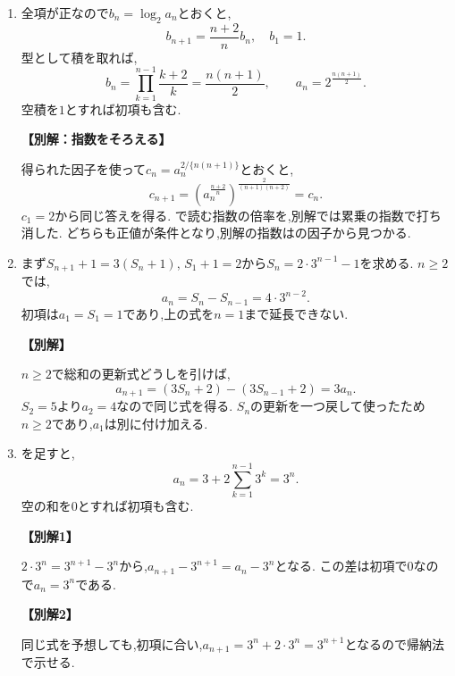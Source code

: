 \begin{enumerate}[label=\textbf{問\arabic*.},leftmargin=3.8em,format=\bookitemlink{practice-basic}{solution}{problem}]
          \item 全項が正なので$b_n=\log_2a_n$とおくと,
                  \[
                    b_{n+1}=\frac{n+2}{n}b_n,\quad b_1=1.
                  \]
                  型として積を取れば,
                  \[
                    b_n=\prod_{k=1}^{n-1}\frac{k+2}{k}=\frac{n(n+1)}2,
                    \qquad a_n=2^{\frac{n(n+1)}2}.
                  \]
                  空積を$1$とすれば初項も含む.
                  \par\smallskip\noindent\textbf{【別解：指数をそろえる】}\par
                  得られた因子を使って$c_n=a_n^{2/\{n(n+1)\}}$とおくと,
                  \[
                    c_{n+1}
                      =\left(a_n^{\frac{n+2}{n}}\right)^{\frac2{(n+1)(n+2)}}
                      =c_n.
                  \]
                  $c_1=2$から同じ答えを得る.
                  で読む指数の倍率を,別解では累乗の指数で打ち消した.
                  どちらも正値が条件となり,別解の指数はの因子から見つかる.

          \item まず$S_{n+1}+1=3(S_n+1)$, $S_1+1=2$から$S_n=2\cdot3^{n-1}-1$を求める.
                  $n\ge2$では,
                  \[
                    a_n=S_n-S_{n-1}=4\cdot3^{n-2}.
                  \]
                  初項は$a_1=S_1=1$であり,上の式を$n=1$まで延長できない.
                  \par\smallskip\noindent\textbf{【別解】}\par
                  $n\ge2$で総和の更新式どうしを引けば,
                  \[
                    a_{n+1}=(3S_n+2)-(3S_{n-1}+2)=3a_n.
                  \]
                  $S_2=5$より$a_2=4$なので同じ式を得る.
                  $S_n$の更新を一つ戻して使ったため$n\ge2$であり,$a_1$は別に付け加える.

          \item {}を足すと,
                  \[
                    a_n=3+2\sum_{k=1}^{n-1}3^k=3^n.
                  \]
                  空の和を$0$とすれば初項も含む.
                  \par\smallskip\noindent\textbf{【別解1】}\par
                  $2\cdot3^n=3^{n+1}-3^n$から,$a_{n+1}-3^{n+1}=a_n-3^n$となる.
                  この差は初項で$0$なので$a_n=3^n$である.
                  \par\smallskip\noindent\textbf{【別解2】}\par
                  同じ式を予想しても,初項に合い,$a_{n+1}=3^n+2\cdot3^n=3^{n+1}$となるので帰納法で示せる.


\end{enumerate}
